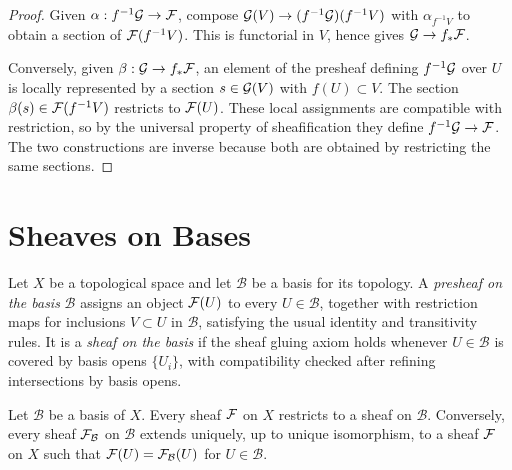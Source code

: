 \begin{proof}
Given \(\alpha:f^{-1}\mathcal{G}\to\mathcal{F}\), compose
\(\mathcal{G}(V)\to(f^{-1}\mathcal{G})(f^{-1}V)\) with
\(\alpha_{f^{-1}V}\) to obtain a section of \(\mathcal{F}(f^{-1}V)\).  This is
functorial in \(V\), hence gives \(\mathcal{G}\to f_*\mathcal{F}\).

Conversely, given \(\beta:\mathcal{G}\to f_*\mathcal{F}\), an element of the presheaf defining
\(f^{-1}\mathcal{G}\) over \(U\) is locally represented by a section
\(s\in\mathcal{G}(V)\) with \(f(U)\subset V\).  The section
\(\beta(s)\in\mathcal{F}(f^{-1}V)\) restricts to \(\mathcal{F}(U)\).  These local assignments
are compatible with restriction, so by the universal property of
sheafification they define \(f^{-1}\mathcal{G}\to\mathcal{F}\).  The two constructions are
inverse because both are obtained by restricting the same sections.
\end{proof}

\section{Sheaves on Bases}

\begin{definition}
Let \(X\) be a topological space and let \(\mathcal B\) be a basis for its
topology.  A \emph{presheaf on the basis} \(\mathcal B\) assigns an object
\(\mathcal{F}(U)\) to every \(U\in\mathcal B\), together with restriction maps for
inclusions \(V\subset U\) in \(\mathcal B\), satisfying the usual identity and
transitivity rules.  It is a \emph{sheaf on the basis} if the sheaf gluing
axiom holds whenever \(U\in\mathcal B\) is covered by basis opens
\(\{U_i\}\), with compatibility checked after refining intersections by basis
opens.
\end{definition}

\begin{proposition}
Let \(\mathcal B\) be a basis of \(X\).  Every sheaf \(\mathcal{F}\) on \(X\) restricts
to a sheaf on \(\mathcal B\).  Conversely, every sheaf \(\mathcal{F}_{\mathcal B}\) on
\(\mathcal B\) extends uniquely, up to unique isomorphism, to a sheaf \(\mathcal{F}\) on
\(X\) such that \(\mathcal{F}(U)=\mathcal{F}_{\mathcal B}(U)\) for \(U\in\mathcal B\).
\end{proposition}

